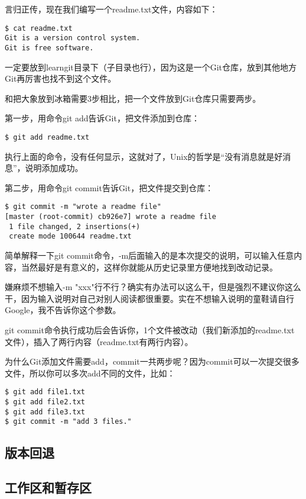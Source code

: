 言归正传，现在我们编写一个readme.txt文件，内容如下：

\begin{verbatim}
$ cat readme.txt
Git is a version control system.
Git is free software.
\end{verbatim}

一定要放到learngit目录下（子目录也行），因为这是一个Git仓库，放到其他地方Git再厉害也找不到这个文件。

和把大象放到冰箱需要3步相比，把一个文件放到Git仓库只需要两步。

第一步，用命令git add告诉Git，把文件添加到仓库：

\begin{verbatim}
$ git add readme.txt
\end{verbatim}

执行上面的命令，没有任何显示，这就对了，Unix的哲学是“没有消息就是好消息”，说明添加成功。

第二步，用命令git commit告诉Git，把文件提交到仓库：

\begin{verbatim}
$ git commit -m "wrote a readme file"
[master (root-commit) cb926e7] wrote a readme file
 1 file changed, 2 insertions(+)
 create mode 100644 readme.txt
\end{verbatim}

简单解释一下git commit命令，-m后面输入的是本次提交的说明，可以输入任意内容，当然最好是有意义的，这样你就能从历史记录里方便地找到改动记录。

嫌麻烦不想输入-m "xxx"行不行？确实有办法可以这么干，但是强烈不建议你这么干，因为输入说明对自己对别人阅读都很重要。实在不想输入说明的童鞋请自行Google，我不告诉你这个参数。

git commit命令执行成功后会告诉你，1个文件被改动（我们新添加的readme.txt文件），插入了两行内容（readme.txt有两行内容）。

为什么Git添加文件需要add，commit一共两步呢？因为commit可以一次提交很多文件，所以你可以多次add不同的文件，比如：

\begin{verbatim}
$ git add file1.txt
$ git add file2.txt
$ git add file3.txt
$ git commit -m "add 3 files."
\end{verbatim}

\subsection{版本回退}

\subsection{工作区和暂存区}

